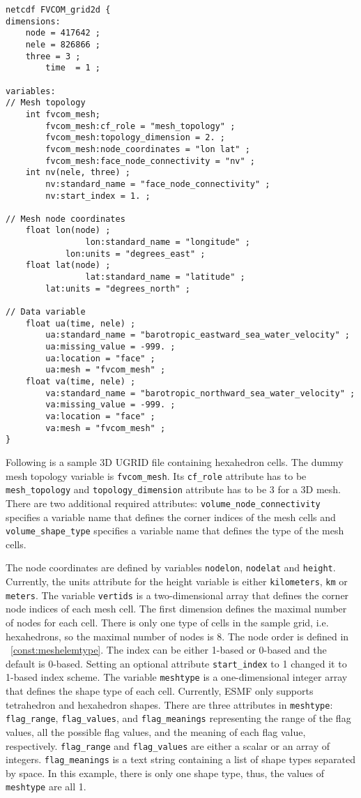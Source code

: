 \begin{verbatim}
netcdf FVCOM_grid2d {
dimensions:
	node = 417642 ;
	nele = 826866 ;
	three = 3 ;
        time  = 1 ;

variables:
// Mesh topology
	int fvcom_mesh;
		fvcom_mesh:cf_role = "mesh_topology" ;
		fvcom_mesh:topology_dimension = 2. ;
		fvcom_mesh:node_coordinates = "lon lat" ;
		fvcom_mesh:face_node_connectivity = "nv" ;
	int nv(nele, three) ;
		nv:standard_name = "face_node_connectivity" ;
		nv:start_index = 1. ;

// Mesh node coordinates
	float lon(node) ;
                lon:standard_name = "longitude" ;
	        lon:units = "degrees_east" ;
	float lat(node) ;
                lat:standard_name = "latitude" ;
		lat:units = "degrees_north" ;

// Data variable
	float ua(time, nele) ;
		ua:standard_name = "barotropic_eastward_sea_water_velocity" ;
		ua:missing_value = -999. ;
		ua:location = "face" ;
		ua:mesh = "fvcom_mesh" ;
	float va(time, nele) ;
		va:standard_name = "barotropic_northward_sea_water_velocity" ;
		va:missing_value = -999. ;
		va:location = "face" ;
		va:mesh = "fvcom_mesh" ;
}
\end{verbatim}

Following is a sample 3D UGRID file containing hexahedron cells. The dummy mesh topology variable is {\tt fvcom\_mesh}. Its {\tt cf\_role} attribute has to be {\tt mesh\_topology}
and {\tt topology\_dimension} attribute has to be 3 for a 3D mesh.  There are two additional required attributes:
{\tt volume\_node\_connectivity} specifies a variable name that defines the corner indices of the mesh cells and
{\tt volume\_shape\_type} specifies a variable name that defines the type of the mesh cells.

The node coordinates are defined by variables {\tt nodelon}, {\tt nodelat} and {\tt height}. Currently, the units
attribute for the height variable is either {\tt kilometers}, {\tt km} or {\tt meters}.
The variable {\tt vertids} is a two-dimensional array that defines the corner node indices of each mesh cell. The first dimension
defines the maximal number of nodes for each cell. There is only one type of cells in the sample grid, i.e. hexahedrons, so the maximal number
of nodes is 8.  The node order is defined in ~\ref{const:meshelemtype}.  The index can be either 1-based or 0-based and
the default is 0-based.
 Setting an optional attribute {\tt start\_index} to 1 changed it to 1-based index scheme.
The variable {\tt meshtype} is a one-dimensional integer array that defines the shape type of each cell.  Currently, ESMF only
supports tetrahedron and hexahedron shapes. There are three attributes in {\tt meshtype}: {\tt flag\_range}, {\tt flag\_values}, and {\tt flag\_meanings} representing the range of the flag values, all the possible flag values, and the meaning of each flag value, respectively.  {\tt flag\_range} and {\tt flag\_values} are either a scalar or an array of integers.  {\tt flag\_meanings} is a text string containing a list of shape types separated by space. In this example, there
is only one shape type, thus, the values of {\tt meshtype} are all 1.

